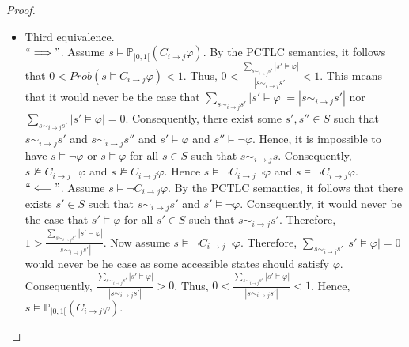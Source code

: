 \begin{proof}
\begin{itemize}
\item Third equivalence. ~\\
    $``\Longrightarrow"$. Assume $s\models \mathbb{P}_{]0,1[} (C_{i \rightarrow j}\varphi)$. By the PCTLC semantics,
    it follows that $0< Prob(s\models C_{i\rightarrow j}\varphi)<1$. Thus,
    $0<\frac{\sum_{s\sim_{i \rightarrow j}s'}|s'\models \varphi| }{|s \sim_{i \rightarrow j}s'|}<1$.
    This means that it would never be the case that $\sum_{s\sim_{i \rightarrow j}s'}|s'\models \varphi| = |s\sim_{i \rightarrow j}s'|$
    nor $\sum_{s\sim_{i \rightarrow j}s'}|s'\models \varphi| = 0$. Consequently, there exist some $s', s'' \in S$
    such that $s\sim_{i \rightarrow j}s'$ and $s\sim_{i \rightarrow j}s''$ and $s'\models \varphi$ and $s''\models \neg \varphi$.
    Hence, it is impossible to have
    $\overline{s}\models \neg\varphi$ or $\overline{s}\models \varphi$ for all $\overline{s}\in S$
    such that $s\sim_{i \rightarrow j}\overline{s}$. Consequently,
    $s\nvDash  C_{i \rightarrow j}\neg\varphi$ and $s\nvDash  C_{i \rightarrow
    j}\varphi$. Hence $s\models \neg C_{i \rightarrow j}\neg\varphi$ and $s\models \neg C_{i \rightarrow j}\varphi$. ~\\
    $``\Longleftarrow"$. Assume $s\models \neg C_{i \rightarrow j}\varphi$. By the PCTLC semantics,
    it follows that there exists $s'\in S$ such that $s\sim_{i \rightarrow j}s'$ and $s'\models \neg \varphi$.
    Consequently, it would never be the case that $s'\models \varphi$ for all $s'\in S$
    such that $s\sim_{i \rightarrow j}s'$. Therefore,
    $1>\frac{\sum_{s\sim_{i \rightarrow j}s'}|s'\models \varphi| }{|s\sim_{i \rightarrow j}s'|}$.
    Now assume $s\models \neg C_{i \rightarrow j}\neg \varphi$. Therefore, $\sum_{s\sim_{i \rightarrow j}s'}|s'\models \varphi| = 0$
    would never be he case as some accessible states should satisfy $\varphi$. %
    Consequently,
    $\frac{\sum_{s\sim_{i \rightarrow j}s'}|s'\models \varphi| }{|s\sim_{i \rightarrow j}s'|}>0$.
    Thus, $0<\frac{\sum_{s\sim_{i \rightarrow j}s'}|s'\models \varphi| }{|s \sim_{i \rightarrow j}s'|}<1$.
    Hence, $s\models \mathbb{P}_{]0,1[} (C_{i \rightarrow
    j}\varphi)$.
\end{itemize}

\end{proof}
\vspace{0.2cm}
